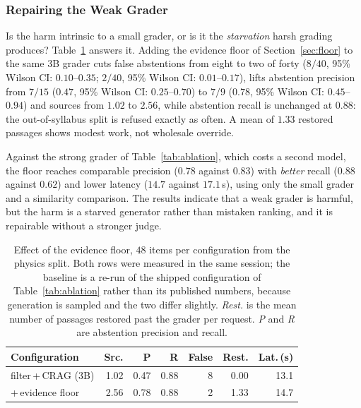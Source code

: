 \documentclass[conference]{IEEEtran}
\begin{document}
\subsubsection{Repairing the Weak Grader}
\label{sec:flooreval}
Is the harm intrinsic to a small grader, or is it the \emph{starvation} harsh
grading produces? Table~\ref{tab:floor} answers it. Adding the evidence floor
of Section~\ref{sec:floor} to the same $3$B grader cuts false abstentions from
eight to two of forty ($8/40$, 95\% Wilson CI: $0.10$--$0.35$;
$2/40$, 95\% Wilson CI: $0.01$--$0.17$), lifts abstention precision
from $7/15$ ($0.47$, 95\% Wilson CI: $0.25$--$0.70$) to $7/9$
($0.78$, 95\% Wilson CI: $0.45$--$0.94$) and sources from
$1.02$ to $2.56$, while abstention recall is unchanged at $0.88$: the
out-of-syllabus split is refused exactly as often. A mean of $1.33$ restored
passages shows modest work, not wholesale override.

Against the strong grader of Table~\ref{tab:ablation}, which costs a second
model, the floor reaches comparable precision ($0.78$ against $0.83$) with
\emph{better} recall ($0.88$ against $0.62$) and lower latency ($14.7$ against
$17.1$\,s), using only the small grader and a similarity comparison. The results indicate that a weak grader is harmful, but the
harm is a starved generator rather than mistaken ranking, and it is repairable
without a stronger judge.

\begin{table}[htbp]
\caption{Effect of the evidence floor, $48$ items per configuration from the
physics split. Both rows were measured in the same session; the baseline is
a re-run of the shipped configuration of Table~\ref{tab:ablation} rather than
its published numbers, because generation is sampled and the two differ
slightly. \emph{Rest.} is the mean number of passages restored past the
grader per request. \emph{P} and \emph{R} are abstention precision and recall.}
\label{tab:floor}
\centering
\small
\setlength{\tabcolsep}{4pt}
\begin{tabular}{@{}lrrrrrr@{}}
\toprule
\textbf{Configuration} & \textbf{Src.} & \textbf{P} & \textbf{R} & \textbf{False} & \textbf{Rest.} & \textbf{Lat.\,(s)} \\
\midrule
filter\,+\,CRAG ($3$B) & 1.02 & 0.47 & 0.88 & 8 & 0.00 & 13.1 \\
\quad +\,evidence floor & 2.56 & 0.78 & 0.88 & 2 & 1.33 & 14.7 \\
\bottomrule
\end{tabular}
\end{table}
\end{document}
